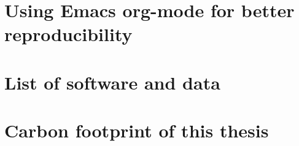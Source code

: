 \chapter{Using Emacs org-mode for better reproducibility}
\label{chapter:orgmode}

    \lipsum[1]

\chapter{List of software and data}
\label{chapter:zenodo}

    \lipsum[1]

\chapter{Carbon footprint of this thesis}
\label{chapter:carbon}

    \lipsum[1]
